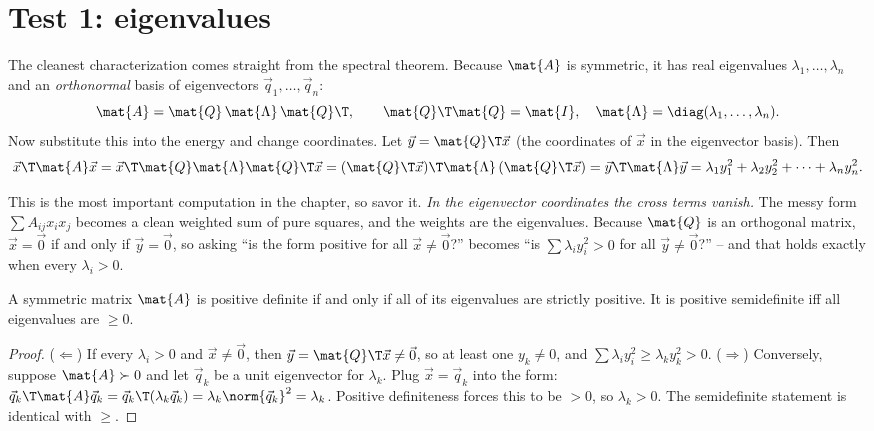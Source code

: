 \section{Test 1: eigenvalues}

The cleanest characterization comes straight from the spectral theorem. Because $\mat{A}$ is
symmetric, it has real eigenvalues $\lambda_1, \dots, \lambda_n$ and an \emph{orthonormal} basis of
eigenvectors $\vec{q}_1, \dots, \vec{q}_n$:
\[
  \mat{A} = \mat{Q}\,\mat{\Lambda}\,\mat{Q}\T, \qquad
  \mat{Q}\T\mat{Q} = \mat{I}, \quad \mat{\Lambda} = \diag(\lambda_1,\dots,\lambda_n).
\]
Now substitute this into the energy and change coordinates. Let $\vec{y} = \mat{Q}\T\vec{x}$ (the
coordinates of $\vec{x}$ in the eigenvector basis). Then
\[
  \vec{x}\T\mat{A}\vec{x}
  = \vec{x}\T\mat{Q}\mat{\Lambda}\mat{Q}\T\vec{x}
  = (\mat{Q}\T\vec{x})\T \mat{\Lambda}\, (\mat{Q}\T\vec{x})
  = \vec{y}\T\mat{\Lambda}\vec{y}
  = \lambda_1 y_1^2 + \lambda_2 y_2^2 + \cdots + \lambda_n y_n^2.
\]

This is the most important computation in the chapter, so savor it. \emph{In the eigenvector
coordinates the cross terms vanish.} The messy form $\sum A_{ij} x_i x_j$ becomes a clean weighted
sum of pure squares, and the weights are the eigenvalues. Because $\mat{Q}$ is an orthogonal matrix,
$\vec{x} = \vec{0}$ if and only if $\vec{y} = \vec{0}$, so asking ``is the form positive for all
$\vec{x}\neq\vec{0}$?'' becomes ``is $\sum \lambda_i y_i^2 > 0$ for all $\vec{y}\neq\vec{0}$?'' --
and that holds exactly when every $\lambda_i > 0$.

\begin{theorem}
\label{ch27:thm-eig}
A symmetric matrix $\mat{A}$ is positive definite if and only if all of its eigenvalues are
strictly positive. It is positive semidefinite iff all eigenvalues are $\geq 0$.
\end{theorem}

\begin{proof}
($\Leftarrow$) If every $\lambda_i > 0$ and $\vec{x}\neq\vec{0}$, then $\vec{y}=\mat{Q}\T\vec{x}
\neq\vec{0}$, so at least one $y_k \neq 0$, and $\sum \lambda_i y_i^2 \geq \lambda_k y_k^2 > 0$.
($\Rightarrow$) Conversely, suppose $\mat{A}\succ 0$ and let $\vec{q}_k$ be a unit eigenvector for
$\lambda_k$. Plug $\vec{x} = \vec{q}_k$ into the form:
$\vec{q}_k\T\mat{A}\vec{q}_k = \vec{q}_k\T(\lambda_k\vec{q}_k) = \lambda_k \norm{\vec{q}_k}^2 =
\lambda_k$. Positive definiteness forces this to be $>0$, so $\lambda_k > 0$. The semidefinite
statement is identical with $\geq$.
\end{proof}

